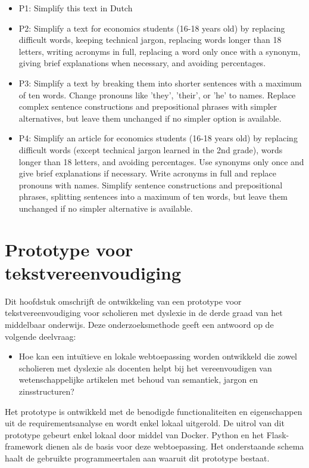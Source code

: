 \begin{itemize}
	\item P1: Simplify this text in Dutch
	\item P2: Simplify a text for economics students (16-18 years old) by replacing difficult words, keeping technical jargon, replacing words longer than 18 letters, writing acronyms in full, replacing a word only once with a synonym, giving brief explanations when necessary, and avoiding percentages.
	\item P3: Simplify a text by breaking them into shorter sentences with a maximum of ten words. Change pronouns like 'they', 'their', or 'he' to names. Replace complex sentence constructions and prepositional phrases with simpler alternatives, but leave them unchanged if no simpler option is available.
	\item P4: Simplify an article for economics students (16-18 years old) by replacing difficult words (except technical jargon learned in the 2nd grade), words longer than 18 letters, and avoiding percentages. Use synonyms only once and give brief explanations if necessary. Write acronyms in full and replace pronouns with names. Simplify sentence constructions and prepositional phrases, splitting sentences into a maximum of ten words, but leave them unchanged if no simpler alternative is available.
\end{itemize}

\section{Prototype voor tekstvereenvoudiging}

Dit hoofdstuk omschrijft de ontwikkeling van een prototype voor tekstvereenvoudiging voor scholieren met dyslexie in de derde graad van het middelbaar onderwijs. Deze onderzoeksmethode geeft een antwoord op de volgende deelvraag: 
\begin{itemize}
	\item Hoe kan een intuïtieve en lokale webtoepassing worden ontwikkeld die zowel scholieren met dyslexie als docenten helpt bij het vereenvoudigen van wetenschappelijke artikelen met behoud van semantiek, jargon en zinsstructuren?
\end{itemize}

Het prototype is ontwikkeld met de benodigde functionaliteiten en eigenschappen uit de requirementsanalyse en wordt enkel lokaal uitgerold. De uitrol van dit prototype gebeurt enkel lokaal door middel van Docker. Python en het Flask-framework dienen als de basis voor deze webtoepassing. Het onderstaande schema haalt de gebruikte programmeertalen aan waaruit dit prototype bestaat. 

